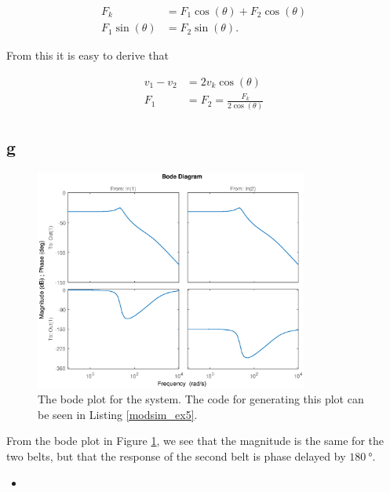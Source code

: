 \documentclass{article}
\newcommand{\matlabscript}[2]{\begin{itemize}\item[]\end{itemize}}
\begin{document}
\begin{align*}
	F_k &= F_1\cos(\theta) + F_2\cos(\theta)\\
	F_1\sin(\theta) &= F_2\sin(\theta).
\end{align*}	

From this it is easy to derive that 

\begin{align*}
	v_1 - v_2 &= 2v_k\cos(\theta)\\
	F_1 &= F_2 = \frac{F_k}{2\cos(\theta)}
\end{align*}

\subsection{g}

\begin{figure}[!ht]\label{fig:bode}
	\centering
	\includegraphics[width = 0.8\textwidth]{modsim_ex5_bode}
    \caption{The bode plot for the system. The code for generating this plot can be seen in Listing \ref{modsim_ex5}.}
\end{figure}

From the bode plot in Figure \ref{fig:bode}, we see that the magnitude is the same for the two belts, but that the response of the second belt is phase delayed by $\SI{180}{\degree}$. 


\matlabscript{modsim_ex5}{Code for making the Bode plot in MATLAB}
\end{document}
